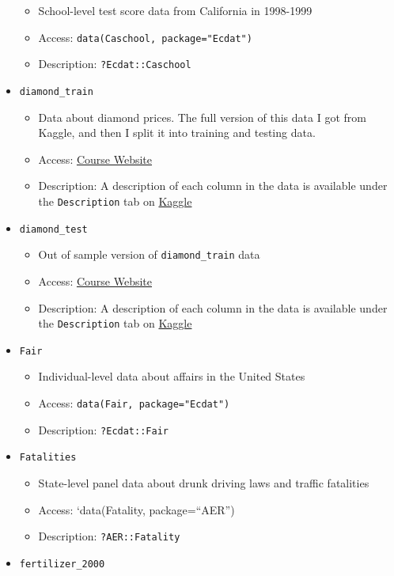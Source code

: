 \documentclass[
  letterpaper,
  DIV=11,
  numbers=noendperiod]{scrreprt}
\begin{document}
\begin{itemize}
  \begin{itemize}
  \item
    School-level test score data from California in 1998-1999
  \item
    Access: \texttt{data(Caschool,\ package="Ecdat")}
  \item
    Description: \texttt{?Ecdat::Caschool}
  \end{itemize}
\item
  \texttt{diamond\_train}

  \begin{itemize}
  \item
    Data about diamond prices. The full version of this data I got from
    Kaggle, and then I split it into training and testing data.
  \item
    Access:
    \href{http://bcallaway11.github.io/Courses/ECON_4750_Fall_2023/}{Course
    Website}
  \item
    Description: A description of each column in the data is available
    under the \texttt{Description} tab on
    \href{https://www.kaggle.com/shivam2503/diamonds/}{Kaggle}
  \end{itemize}
\item
  \texttt{diamond\_test}

  \begin{itemize}
  \item
    Out of sample version of \texttt{diamond\_train} data
  \item
    Access:
    \href{http://bcallaway11.github.io/Courses/ECON_4750_Fall_2023/}{Course
    Website}
  \item
    Description: A description of each column in the data is available
    under the \texttt{Description} tab on
    \href{https://www.kaggle.com/shivam2503/diamonds/}{Kaggle}
  \end{itemize}
\item
  \texttt{Fair}

  \begin{itemize}
  \item
    Individual-level data about affairs in the United States
  \item
    Access: \texttt{data(Fair,\ package="Ecdat")}
  \item
    Description: \texttt{?Ecdat::Fair}
  \end{itemize}
\item
  \texttt{Fatalities}

  \begin{itemize}
  \item
    State-level panel data about drunk driving laws and traffic
    fatalities
  \item
    Access: `data(Fatality, package=``AER'')
  \item
    Description: \texttt{?AER::Fatality}
  \end{itemize}
\item
  \texttt{fertilizer\_2000}


\end{itemize}
\end{document}
